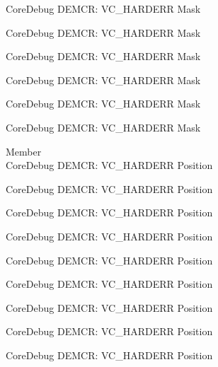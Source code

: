 \begin{DoxyRefList}
\label{deprecated__deprecated000859}%
%
Core\+Debug DEMCR\+: VC\+\_\+\+HARDERR Mask 

\label{deprecated__deprecated000934}%
%
Core\+Debug DEMCR\+: VC\+\_\+\+HARDERR Mask 

\label{deprecated__deprecated001001}%
%
Core\+Debug DEMCR\+: VC\+\_\+\+HARDERR Mask 

\label{deprecated__deprecated001077}%
%
Core\+Debug DEMCR\+: VC\+\_\+\+HARDERR Mask 

\label{deprecated__deprecated001166}%
%
Core\+Debug DEMCR\+: VC\+\_\+\+HARDERR Mask 

\label{deprecated__deprecated001268}%
%
Core\+Debug DEMCR\+: VC\+\_\+\+HARDERR Mask  
\item[Member \doxylink{group___c_m_s_i_s___core_debug_gaed9f42053031a9a30cd8054623304c0a}{Core\+Debug\+\_\+\+DEMCR\+\_\+\+VC\+\_\+\+HARDERR\+\_\+\+Pos} ]\hfill \\
\label{deprecated__deprecated000055}%
%
Core\+Debug DEMCR\+: VC\+\_\+\+HARDERR Position 

\label{deprecated__deprecated000135}%
%
Core\+Debug DEMCR\+: VC\+\_\+\+HARDERR Position 

\label{deprecated__deprecated000199}%
%
Core\+Debug DEMCR\+: VC\+\_\+\+HARDERR Position 

\label{deprecated__deprecated000274}%
%
Core\+Debug DEMCR\+: VC\+\_\+\+HARDERR Position 

\label{deprecated__deprecated000341}%
%
Core\+Debug DEMCR\+: VC\+\_\+\+HARDERR Position 

\label{deprecated__deprecated000417}%
%
Core\+Debug DEMCR\+: VC\+\_\+\+HARDERR Position 

\label{deprecated__deprecated000506}%
%
Core\+Debug DEMCR\+: VC\+\_\+\+HARDERR Position 

\label{deprecated__deprecated000608}%
%
Core\+Debug DEMCR\+: VC\+\_\+\+HARDERR Position 

\label{deprecated__deprecated000714}%
%
Core\+Debug DEMCR\+: VC\+\_\+\+HARDERR Position 


\end{DoxyRefList}
